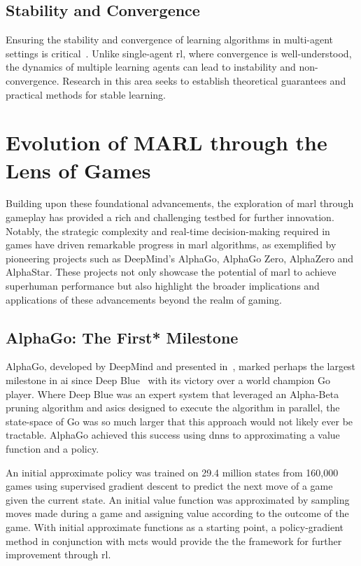     \subsection*{Stability and Convergence}

Ensuring the stability and convergence of learning algorithms in 
multi-agent settings is critical~\cite{papoudakis2021}. 
Unlike single-agent \gls{rl}, where convergence is well-understood, 
the dynamics of multiple learning agents can lead to instability 
and non-convergence. Research in this area seeks to establish 
theoretical guarantees and practical methods for stable learning.


\section{Evolution of MARL through the Lens of Games}%

Building upon these foundational advancements, the exploration of \gls{marl} 
through gameplay has provided a rich and challenging testbed for further 
innovation. Notably, the strategic complexity and real-time decision-making 
required in games have driven remarkable progress in \gls{marl} algorithms, 
as exemplified by pioneering projects such as 
DeepMind's AlphaGo\cite{silver2016}, AlphaGo Zero\cite{silver2017},
AlphaZero\cite{silver2017a} and AlphaStar\cite{vinyals2019}. 
These projects not only showcase the potential of \gls{marl} to 
achieve superhuman performance but also highlight the broader implications 
and applications of these advancements beyond the realm of gaming.

    \subsection*{AlphaGo: The First* Milestone}

AlphaGo, developed by DeepMind and presented in~\cite{silver2016}, 
marked perhaps the largest milestone in \gls{ai} since Deep Blue~%
\cite{campbell2002} with its victory over a world champion Go player.
Where Deep Blue was an expert system that leveraged an Alpha-Beta pruning 
algorithm and \glspl{asic} designed to execute the algorithm in parallel,
the state-space of Go was so much larger that this approach would not 
likely ever be tractable. AlphaGo achieved this success using 
\glspl{dnn} to approximating a value function and a policy.

An initial approximate policy was trained on 29.4 million states 
from 160,000 games using supervised gradient descent to predict 
the next move of a game given the current state.
An initial value function was approximated by sampling moves made 
during a game and assigning value according to the outcome of the game.
%
With initial approximate functions as a starting point,
a policy-gradient method in conjunction with \gls{mcts}
would provide the the framework for further improvement through \gls{rl}.

